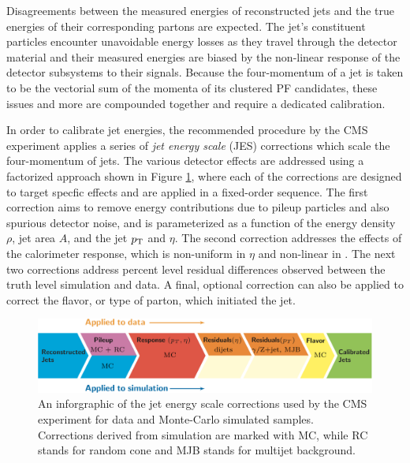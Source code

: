 Disagreements between the measured energies of reconstructed jets and the true energies of their corresponding partons are expected. The jet's constituent particles encounter unavoidable energy losses as they travel through the detector material and their measured energies are biased by the non-linear response of the detector subsystems to their signals. Because the four-momentum of a jet is taken to be the vectorial sum of the momenta of its clustered PF candidates, these issues and more are compounded together and require a dedicated calibration.

In order to calibrate jet energies, the recommended procedure by the CMS experiment applies a series of \textit{jet energy scale} (JES) corrections which scale the four-momentum of jets. The various detector effects are addressed using a factorized approach shown in Figure \ref{fig:jeschain}, where each of the corrections are designed to target specfic effects and are applied in a fixed-order sequence. The first correction aims to remove energy contributions due to pileup particles and also spurious detector noise, and is parameterized as a function of the energy density $\rho$, jet area $A$, and the jet $p_{\mathrm{T}}$ and $\eta$. The second correction addresses the effects of the calorimeter response, which is non-uniform in $\eta$ and non-linear in \pT. The next two corrections address percent level residual differences observed between the truth level simulation and data. A final, optional correction can also be applied to correct the flavor, or type of parton, which initiated the jet.

\begin{figure}[htbp]
  \centering
    \includegraphics[width=6in]{images/jeschain}
    \caption[Jet Energy Scale Corrections Infographic]{An inforgraphic of the jet energy scale corrections used by the CMS experiment for data and Monte-Carlo simulated samples. Corrections derived from simulation are marked with MC, while RC stands for random cone and MJB stands for multijet background.\cite{CMSJES}}
    \label{fig:jeschain}
\end{figure}

